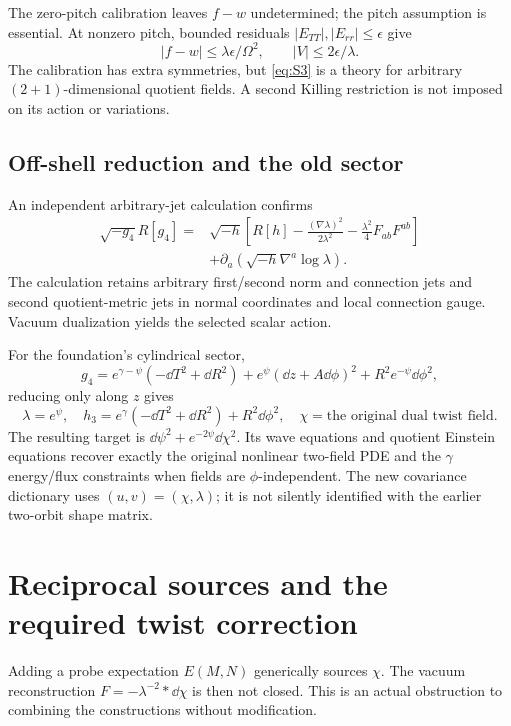 \documentclass[11pt]{article}
\begin{document}
The zero-pitch calibration leaves $f-w$ undetermined; the pitch assumption is essential. At nonzero pitch, bounded residuals $|E_{TT}|,|E_{rr}|\le\epsilon$ give
\[
|f-w|\le\lambda\epsilon/\Omega^2,\qquad |V|\le2\epsilon/\lambda.
\]
The calibration has extra symmetries, but \eqref{eq:S3} is a theory for arbitrary $(2+1)$-dimensional quotient fields. A second Killing restriction is not imposed on its action or variations.

\subsection{Off-shell reduction and the old sector}
An independent arbitrary-jet calculation confirms
\begin{equation}\label{eq:KKdensity}
\begin{split}
\sqrt{-g_4}R[g_4]={}&\sqrt{-h}\left[R[h]-\frac{(\nabla\lambda)^2}{2\lambda^2}
-\frac{\lambda^2}{4}F_{ab}F^{ab}\right]\\
&+\partial_a\left(\sqrt{-h}\nabla^a\log\lambda\right).
\end{split}
\end{equation}
The calculation retains arbitrary first/second norm and connection jets and second quotient-metric jets in normal coordinates and local connection gauge. Vacuum dualization yields the selected scalar action.

For the foundation's cylindrical sector,
\[
g_4=e^{\gamma-\psi}(-\dd T^2+\dd R^2)+e^\psi(\dd z+A\dd\phi)^2
+R^2e^{-\psi}\dd\phi^2,
\]
reducing only along $z$ gives
\[
\lambda=e^\psi,\quad h_3=e^\gamma(-\dd T^2+\dd R^2)+R^2\dd\phi^2,
\quad \chi=\text{the original dual twist field}.
\]
The resulting target is $\dd\psi^2+e^{-2\psi}\dd\chi^2$. Its wave equations and quotient Einstein equations recover exactly the original nonlinear two-field PDE and the $\gamma$ energy/flux constraints when fields are $\phi$-independent. The new covariance dictionary uses $(u,v)=(\chi,\lambda)$; it is not silently identified with the earlier two-orbit shape matrix.

\section{Reciprocal sources and the required twist correction}
Adding a probe expectation $E(M,N)$ generically sources $\chi$. The vacuum reconstruction $F=-\lambda^{-2}*\dd\chi$ is then not closed. This is an actual obstruction to combining the constructions without modification.
\end{document}
